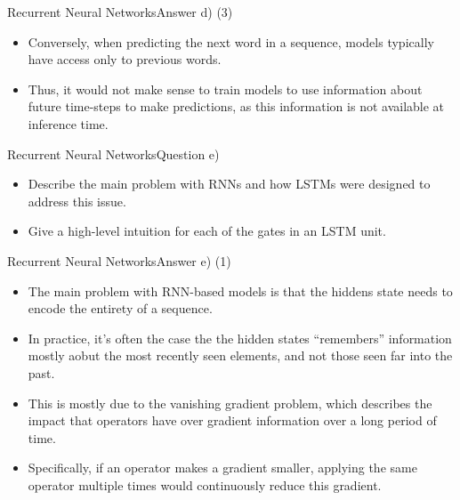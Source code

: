 \documentclass[t]{beamer}
\begin{document}
\begin{frame}{Recurrent Neural Networks}{Answer d) (3)}
    \begin{itemize}
        \item Conversely, when predicting the next word in a sequence, models
              typically have access only to previous words.
        \item Thus, it would not make sense to train models to use information
              about future time-steps to make predictions, as this information
              is not available at inference time.
    \end{itemize}
\end{frame}

\begin{frame}{Recurrent Neural Networks}{Question e)}
    \begin{itemize}
        \item Describe the main problem with RNNs and how LSTMs were designed to
              address this issue.
        \item Give a high-level intuition for each of the gates in an LSTM unit.
    \end{itemize}
\end{frame}

\begin{frame}{Recurrent Neural Networks}{Answer e) (1)}
    \begin{itemize}
        \item The main problem with RNN-based models is that the hiddens state
              needs to encode the entirety of a sequence.
        \item In practice, it's often the case the the hidden states
              ``remembers'' information mostly aobut the most recently seen
              elements, and not those seen far into the past.
        \item This is mostly due to the vanishing gradient problem, which
              describes the impact that operators have over gradient information
              over a long period of time.
        \item Specifically, if an operator makes a gradient smaller, applying
              the same operator multiple times would continuously reduce this
              gradient.
    \end{itemize}
\end{frame}
\end{document}
